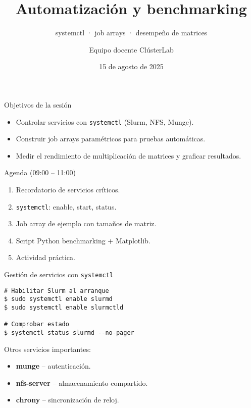 \documentclass[aspectratio=169,professionalfonts]{beamer}
\title[ClústerLab • Día 6]{Automatización y benchmarking}
\subtitle{systemctl · job arrays · desempeño de matrices}
\author{Equipo docente ClústerLab}
\date{15 de agosto de 2025}
\begin{document}
\begin{frame}[plain]
  \titlepage
\end{frame}

\begin{frame}[fragile]{Objetivos de la sesión}
  \begin{itemize}
    \item Controlar servicios con \texttt{systemctl} (Slurm, NFS, Munge).
    \item Construir job arrays paramétricos para pruebas automáticas.
    \item Medir el rendimiento de multiplicación de matrices y graficar resultados.
  \end{itemize}
\end{frame}

\begin{frame}[fragile]{Agenda (09:00 – 11:00)}
  \begin{enumerate}
    \item Recordatorio de servicios críticos.
    \item \texttt{systemctl}: enable, start, status.
    \item Job array de ejemplo con tamaños de matriz.
    \item Script Python benchmarking + Matplotlib.
    \item Actividad práctica.
  \end{enumerate}
\end{frame}

\begin{frame}[fragile]{Gestión de servicios con \texttt{systemctl}}
  \begin{verbatim}
# Habilitar Slurm al arranque
$ sudo systemctl enable slurmd
$ sudo systemctl enable slurmctld

# Comprobar estado
$ systemctl status slurmd --no-pager
  \end{verbatim}
  \pause
  Otros servicios importantes:
  \begin{itemize}
    \item \textbf{munge} – autenticación.
    \item \textbf{nfs-server} – almacenamiento compartido.
    \item \textbf{chrony} – sincronización de reloj.
  \end{itemize}
\end{frame}
\end{document}
